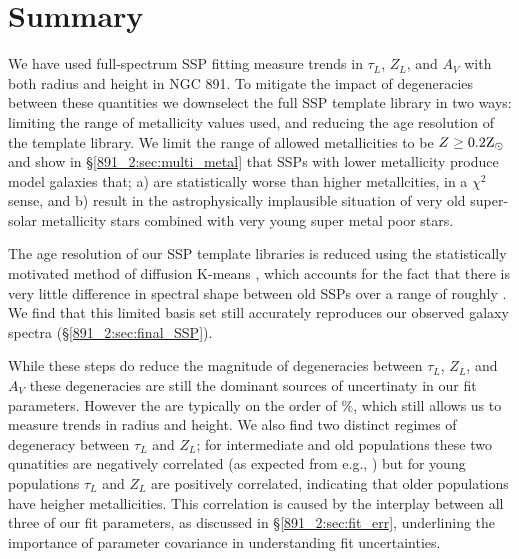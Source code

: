\section{Summary}
\label{891_2:sec:summary}

We have used full-spectrum SSP fitting measure trends in $\tau_L$,
$Z_L$, and $A_V$ with both radius and height in NGC 891. To mitigate
the impact of degeneracies between these quantities we downselect the
full  SSP template library in two ways: limiting
the range of metallicity values used, and reducing the age resolution
of the template library. We limit the range of allowed metallicities
to be $Z \geq 0.2\mathrm{Z}_{\odot}$ and show in \S\ref{891_2:sec:multi_metal} that SSPs
with lower metallicity produce model galaxies that; a) are
statistically worse than higher metallcities, in a $\chi^2$ sense, and
b) result in the astrophysically implausible situation of very old
super-solar metallicity stars combined with very young super metal
poor stars.

The age resolution of our SSP template libraries is reduced using the
statistically motivated method of diffusion K-means
, which accounts for the fact that there is very
little difference in spectral shape between old SSPs over a range of
roughly . We find that this limited basis set still
accurately reproduces our observed galaxy spectra
(\S\ref{891_2:sec:final_SSP}).

While these steps do reduce the magnitude of degeneracies between
$\tau_L$, $Z_L$, and $A_V$ these degeneracies are still the dominant
sources of uncertinaty in our fit parameters. However the are
typically on the order of \%, which still allows us to measure
trends in radius and height. We also find two distinct regimes of
degeneracy between $\tau_L$ and $Z_L$; for intermediate and old
populations these two qunatities are negatively correlated (as
expected from e.g., \citet{Oconnel76,Aaronson78,Worthey94,dePaz02})
but for young populations $\tau_L$ and $Z_L$ are positively
correlated, indicating that older populations have heigher
metallicities. This correlation is caused by the interplay between all
three of our fit parameters, as discussed in \S\ref{891_2:sec:fit_err},
underlining the importance of parameter covariance in understanding
fit uncertainties.


